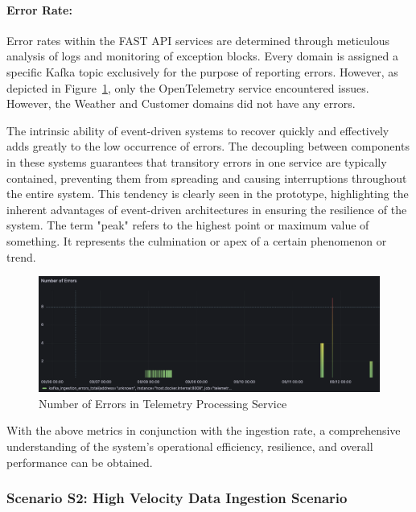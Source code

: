 \documentclass[preprint,12pt]{elsarticle}
\begin{document}
\paragraph{Error Rate:}

Error rates within the FAST API services are determined through meticulous analysis of logs and monitoring of exception blocks. Every domain is assigned a specific Kafka topic exclusively for the purpose of reporting errors. However, as depicted in Figure~\ref{numberOfErrorsInTelemetryProcessingService}, only the OpenTelemetry service encountered issues. However, the Weather and Customer domains did not have any errors.

The intrinsic ability of event-driven systems to recover quickly and effectively adds greatly to the low occurrence of errors. The decoupling between components in these systems guarantees that transitory errors in one service are typically contained, preventing them from spreading and causing interruptions throughout the entire system. This tendency is clearly seen in the prototype, highlighting the inherent advantages of event-driven architectures in ensuring the resilience of the system. The term "peak" refers to the highest point or maximum value of something. It represents the culmination or apex of a certain phenomenon or trend.

\begin{figure}[h!]
  \centering
  \includegraphics[width=\textwidth]{images/number-of-errors-in-telemetry-processing-service.png}
  \caption{Number of Errors in Telemetry Processing Service}
  \label{numberOfErrorsInTelemetryProcessingService}
\end{figure}

With the above metrics in conjunction with the ingestion rate, a comprehensive understanding of the system's operational efficiency, resilience, and overall performance can be obtained.

\subsubsection{Scenario S2: High Velocity Data Ingestion Scenario}
\end{document}
